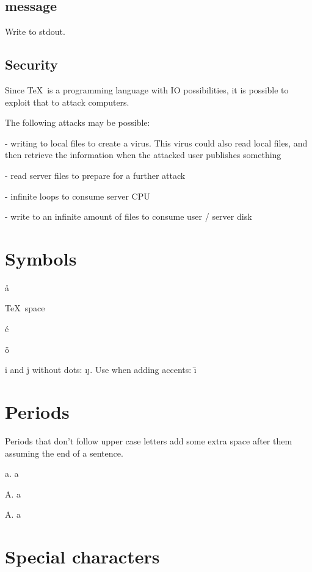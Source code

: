  \subsection{message}

    Write to stdout.


  \subsection{Security}

    Since \TeX\ is a programming language with IO possibilities, it is possible to exploit that to attack computers.

    The following attacks may be possible:

    - writing to local files to create a virus. This virus could also read local files, and then retrieve the information when the attacked user publishes something

    - read server files to prepare for a further attack

    - infinite loops to consume server CPU

    - write to an infinite amount of files to consume user / server disk

\section{Symbols}

  \aa

  \dag

  \TeX\ space

  \'e

  \"o

  i and j without dots: \i \j. Use when adding accents: \=\i

  {}

  \section{Periods}

  Periods that don't follow upper case letters add some extra space after them assuming the end of a sentence.

  a. a

  A. a

  A\null. a

\section{Special characters}

